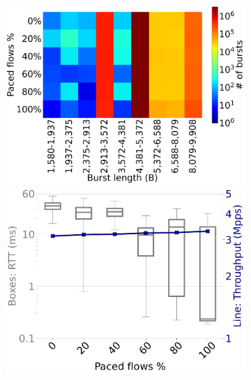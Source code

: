 



\begin{figure}
    \centering
    \begin{subfigure}[t]{0.40\linewidth}
    \centering
    	\includegraphics[width=1\linewidth]{figs/pacing1.pdf}
    	\includegraphics[width=1\linewidth]{figs/pacing_intra_rack_rtt_tput.pdf}

\end{subfigure}
\end{figure}
